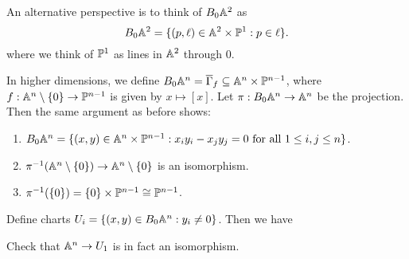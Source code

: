 \begin{remark}
  An alternative perspective is
  to think of $B_0\mathbb{A}^2$ as
  \[B_0 \mathbb{A}^2 = \{(p, \ell) \in \mathbb{A}^2 \times \mathbb{P}^1 : p \in \ell\}.\]
  where we think of $\mathbb{P}^1$ as lines
  in $\mathbb{A}^2$ through $0$.
\end{remark}

\begin{example}
  In higher dimensions, we define
  $B_0 \mathbb{A}^n = \overline{\Gamma}_f \subseteq \mathbb{A}^n \times \mathbb{P}^{n-1}$,
  where $f : \mathbb{A}^n \setminus \{0\} \to \mathbb{P}^{n - 1}$
  is given by $x \mapsto [x]$.
  Let $\pi : B_0 \mathbb{A}^n \to \mathbb{A}^n$
  be the projection. Then the same
  argument as before shows:
  \begin{enumerate}
    \item $B_0 \mathbb{A}^n = \{(x, y) \in \mathbb{A}^n \times \mathbb{P}^{n - 1} : x_i y_i - x_j y_j = 0 \text{ for all } 1 \le i, j \le n\}$.
    \item $\pi^{-1}(\mathbb{A}^n \setminus \{0\}) \to \mathbb{A}^n \setminus \{0\}$
      is an isomorphism.
    \item $\pi^{-1}(\{0\}) = \{0\} \times \mathbb{P}^{n - 1} \cong \mathbb{P}^{n - 1}$.
  \end{enumerate}
\end{example}

\begin{remark}
  Define charts $U_i = \{(x, y) \in B_0 \mathbb{A}^n : y_i \ne 0\}$.
  Then we have
  \begin{center}
  \end{center}
  Check that $\mathbb{A}^n \to U_1$
  is in fact an isomorphism.
\end{remark}

